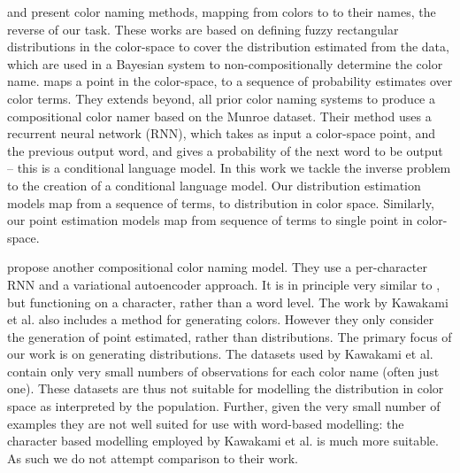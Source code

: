 \documentclass[11pt,a4paper]{article}
\newcommand{\textcite}{\citet}
\begin{document}
\textcite{mcmahan2015bayesian} and \textcite{meomcmahanstone:color} present color naming methods, mapping from colors to to their names, the reverse of our task.
These works are based on defining fuzzy rectangular distributions in the color-space to cover the distribution estimated from the data, which are used in a Bayesian system to non-compositionally determine the color name.
%
%
\textcite{2016arXiv160603821M} maps a point in the color-space, to a sequence of probability estimates over color terms.
They extends beyond, all prior color naming systems to produce a compositional color namer based on the Munroe dataset.
Their method uses a recurrent neural network (RNN), which takes as input a color-space point, and the previous output word, and gives a probability of the next word to be output -- this is a conditional language model.
In this work we tackle the inverse problem to the creation of a conditional language model.
Our distribution estimation models map from a sequence of terms, to distribution in color space.
Similarly, our point estimation models map from sequence of terms to single point in color-space.



\textcite{DBLP:journals/corr/KawakamiDRS16} propose another compositional color naming model.
They use a per-character RNN and a variational autoencoder approach.
It is in principle very similar to \textcite{2016arXiv160603821M}, but functioning on a character, rather than a word level.
The work by Kawakami et al. also includes a method for generating colors.
However they only consider the generation of point estimated, rather than distributions.
The primary focus of our work is on generating distributions.
The datasets used by Kawakami et al. contain only very small numbers of observations for each color name (often just one).
These datasets are thus not suitable for modelling the distribution in color space as interpreted by the population.
Further, given the very small number of examples they are not well suited for use with word-based modelling: the character based modelling employed by Kawakami et al. is much more suitable.
As such we do not attempt comparison to their work.
\end{document}
